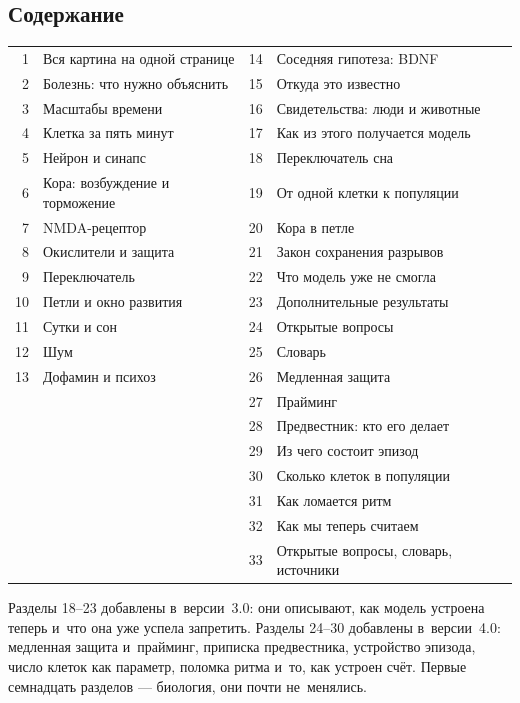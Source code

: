 \documentclass[11pt,a4paper,landscape,twocolumn]{article}
\begin{document}
\subsection{Содержание}
{\small
\begin{tabular}{@{}r@{\ \ }l@{\qquad}r@{\ \ }l@{}}
1 & Вся картина на одной странице & 14 & Соседняя гипотеза: BDNF\\
2 & Болезнь: что нужно объяснить & 15 & Откуда это известно\\
3 & Масштабы времени & 16 & Свидетельства: люди и животные\\
4 & Клетка за пять минут & 17 & Как из этого получается модель\\
5 & Нейрон и синапс & 18 & Переключатель сна\\
6 & Кора: возбуждение и торможение & 19 & От одной клетки к популяции\\
7 & NMDA-рецептор & 20 & Кора в петле\\
8 & Окислители и защита & 21 & Закон сохранения разрывов\\
9 & Переключатель & 22 & Что модель уже не смогла\\
10 & Петли и окно развития & 23 & Дополнительные результаты\\
11 & Сутки и сон & 24 & Открытые вопросы\\
12 & Шум & 25 & Словарь\\
13 & Дофамин и психоз & 26 & Медленная защита\\
 & & 27 & Прайминг\\
 & & 28 & Предвестник: кто его делает\\
 & & 29 & Из чего состоит эпизод\\
 & & 30 & Сколько клеток в популяции\\
 & & 31 & Как ломается ритм\\
 & & 32 & Как мы теперь считаем\\
 & & 33 & Открытые вопросы, словарь, источники\\
\end{tabular}}

Разделы 18–23 добавлены в~версии~3.0: они описывают, как модель устроена теперь и~что она уже успела запретить. Разделы 24–30 добавлены в~версии~4.0: медленная защита и~прайминг, приписка предвестника, устройство эпизода, число клеток как параметр, поломка ритма и~то, как устроен счёт. Первые семнадцать разделов — биология, они почти не~менялись.

\end{document}
